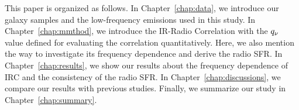 This paper is organized as follows.
In Chapter~\ref{chap:data}, we introduce our galaxy samples and the low-frequency emissions used in this study.
In Chapter~\ref{chap:mmthod}, we introduce the IR-Radio Correlation with the $q_{\nu}$ value defined for evaluating the correlation quantitatively. Here, we also mention the way to investigate its frequency dependence and derive the radio SFR\@.
In Chapter~\ref{chap:results}, we show our results about the frequency dependence of IRC and the consistency of the radio SFR\@.
In Chapter~\ref{chap:discussions}, we compare our results with previous studies.
Finally, we summarize our study in Chapter~\ref{chap:summary}.



%
%




